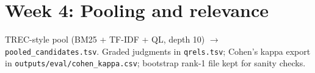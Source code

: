 \section{Week 4: Pooling and relevance}
TREC-style pool (BM25 + TF-IDF + QL, depth 10) $\rightarrow$ \texttt{pooled\_candidates.tsv}. Graded judgments in \texttt{qrels.tsv}; Cohen's kappa export in \texttt{outputs/eval/cohen\_kappa.csv}; bootstrap rank-1 file kept for sanity checks.

